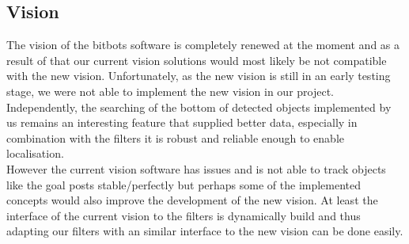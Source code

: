 \documentclass[lnicst,a4paper]{svmultln}
\begin{document}
\subsection{Vision}
\label{sec:results_vision}
The vision of the bitbots software is completely renewed at the moment and as a result of that our current vision solutions would most likely be not compatible with the new vision. Unfortunately, as the new vision is still in an early testing stage, we were not able to implement the new vision in our project.
\\
Independently, the searching of the bottom of detected objects implemented by us remains an interesting feature that supplied better data, especially in combination with the filters it is robust and reliable enough to enable localisation.
\\
However the current vision software has issues and is not able to track objects like the goal posts stable/perfectly but perhaps some of the implemented concepts would also improve the development of the new vision. At least the interface of the current vision to the filters is dynamically build and thus adapting our filters with an similar interface to the new vision can be done easily.
\end{document}
